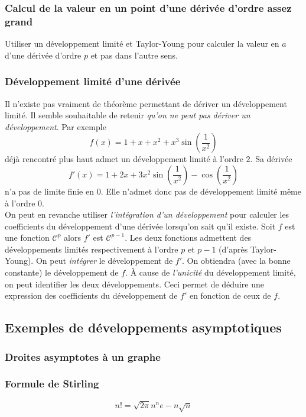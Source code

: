 \subsubsection{Calcul de la valeur en un point d'une dérivée d'ordre assez grand}
Utiliser un développement limité et Taylor-Young pour calculer la valeur en $a$ d'une dérivée d'ordre $p$ et pas dans l'autre sens.

\subsubsection{Développement limité d'une dérivée}
 Il n'existe pas vraiment de théorème permettant de dériver un développement limité. Il semble souhaitable de retenir \emph{qu'on ne peut pas dériver un développement}. Par exemple
\begin{displaymath}
 f(x) = 1+x+x^2 + x^3\sin(\frac{1}{x^2})
\end{displaymath}
déjà rencontré plus haut admet un développement limité à l'ordre $2$. Sa dérivée
\begin{displaymath}
 f'(x)= 1+2x+3x^2\sin(\frac{1}{x^2}) - \cos(\frac{1}{x^2})
\end{displaymath}
n'a pas de limite finie en $0$. Elle n'admet donc pas de développement limité même à l'ordre $0$.\\
On peut en revanche utiliser \emph{l'intégration d'un développement} pour calculer les coefficients du développement d'une dérivée lorsqu'on sait qu'il existe.\newline
Soit $f$ est une fonction $\mathcal C^p$ alors $f'$ est $\mathcal C^{p-1}$. Les deux fonctions admettent des développements limités respectivement à l'ordre $p$ et $p-1$ (d'après Taylor-Young).\newline
On peut \emph{intégrer} le développement de $f'$. On obtiendra (avec la bonne constante) le développement de $f$. \`A cause de \emph{l'unicité} du développement limité, on peut identifier les deux développements. Ceci permet de déduire une expression des coefficients du développement de $f'$ en fonction de ceux de $f$.

\subsection{Exemples de développements asymptotiques}
\subsubsection{Droites asymptotes à un graphe}
\subsubsection{Formule de Stirling}
\begin{displaymath}
  n! = \sqrt{2\pi} n^n e-n \sqrt{n}
\end{displaymath}

